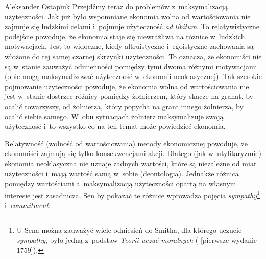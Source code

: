 \begin{artplenv}{Aleksander Ostapiuk}
Przejdźmy teraz do problemów z~maksymalizacją użyteczności. Jak już było wspomniane ekonomia wolna od wartościowania nie
zajmuje się ludzkimi celami i~pojmuje użyteczność \textit{ad libitum}. To relatywistyczne podejście powoduje, że
ekonomia staje się niewrażliwa na różnice w~ludzkich motywacjach. Jest to widoczne, kiedy altruistyczne i~egoistyczne
zachowania są włożone do tej samej czarnej skrzynki użyteczności. To oznacza, że ekonomiści nie są w~stanie
zauważyć odmienności pomiędzy tymi dwoma różnymi motywacjami (obie mogą maksymalizować użyteczność w~ekonomii
neoklasycznej). Tak szerokie pojmowanie użyteczności powoduje, że ekonomia wolna od wartościowania nie jest w~stanie
dostrzec różnicy pomiędzy żołnierzem, który skacze na granat, by ocalić towarzyszy, od żołnierza, który popycha na
grant innego żołnierza, by ocalić siebie samego. W~obu sytuacjach żołnierz maksymalizuje swoją użyteczność i~to
wszystko co na ten temat może powiedzieć ekonomia. 

Relatywność (wolność od wartościowania) metody ekonomicznej powoduje, że ekonomiści zajmują się tylko konsekwencjami
akcji. Dlatego (jak w~utylitaryzmie) ekonomia neoklasyczna nie uznaje żadnych wartości, które są niezależne od miar
użyteczności i~mają wartość samą w~sobie (deontologia). Jednakże różnica pomiędzy wartościami a~maksymalizacją
użyteczności opartą na własnym interesie jest zasadnicza. Sen by pokazać te różnice wprowadza pojęcia
\textit{sympathy}\footnote{U Sena można zauważyć wiele odniesień do Smitha, dla którego uczucie \textit{sympathy}, było
jedną z~podstaw \textit{Teorii uczuć moralnych}
(\cite{smith_teoria_1989} [pierwsze wydanie 1759]).
}
i~\textit{commitment}:



\end{artplenv}
